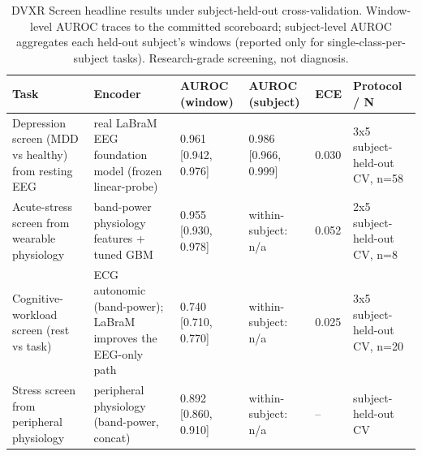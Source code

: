 \begin{table}[t]
\centering
\footnotesize
\caption{DVXR Screen headline results under subject-held-out cross-validation. Window-level AUROC traces to the committed scoreboard; subject-level AUROC aggregates each held-out subject's windows (reported only for single-class-per-subject tasks). Research-grade screening, not diagnosis.}
\label{tab:headline}
\begin{tabular}{p{2.7cm}p{3.0cm}p{2.5cm}p{2.5cm}p{0.9cm}p{2.7cm}}
\toprule
Task & Encoder & AUROC (window) & AUROC (subject) & ECE & Protocol / N \\
\midrule
Depression screen (MDD vs healthy) from resting EEG & real LaBraM EEG foundation model (frozen linear-probe) & 0.961 [0.942, 0.976] & 0.986 [0.966, 0.999] & 0.030 & 3x5 subject-held-out CV, n=58 \\
Acute-stress screen from wearable physiology & band-power physiology features + tuned GBM & 0.955 [0.930, 0.978] & within-subject: n/a & 0.052 & 2x5 subject-held-out CV, n=8 \\
Cognitive-workload screen (rest vs task) & ECG autonomic (band-power); LaBraM improves the EEG-only path & 0.740 [0.710, 0.770] & within-subject: n/a & 0.025 & 3x5 subject-held-out CV, n=20 \\
Stress screen from peripheral physiology & peripheral physiology (band-power, concat) & 0.892 [0.860, 0.910] & within-subject: n/a & -- & subject-held-out CV \\
\bottomrule
\end{tabular}
\end{table}
